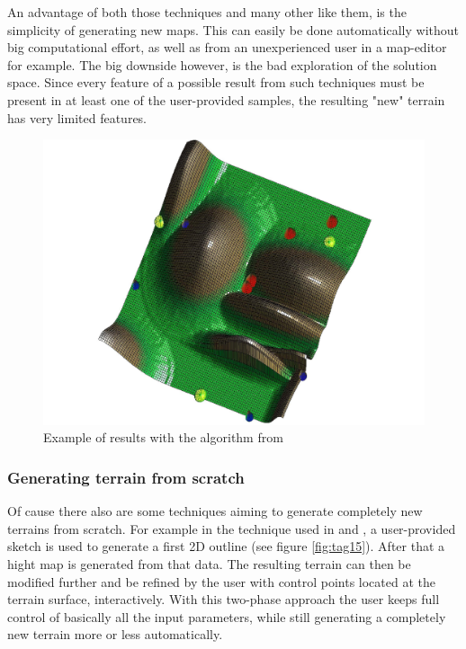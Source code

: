 An advantage of both those techniques and many other like them, is the simplicity of generating new maps. This can easily be done automatically without big computational effort, as well as from an unexperienced user in a map-editor for example. The big downside however, is the bad exploration of the solution space. Since every feature of a possible result from such techniques must be present in at least one of the user-provided samples, the resulting "new" terrain has very limited features.

\begin{figure}[htb]
	\centering
	\includegraphics[width=\linewidth]{RZL12/rthrhrh.jpg}
	\caption{Example of results with the algorithm from \cite{togelius2010towards}}
	\label{fig:tag23}
\end{figure}

\subsubsection{Generating terrain from scratch}
Of cause there also are some techniques aiming to generate completely new terrains from scratch. For example in the technique used in \cite{ong2005terrain} and \cite{saunders2006realistic}, a user-provided sketch is used to generate a first 2D outline (see figure \ref{fig:tag15}). After that a hight map is generated from that data. The resulting terrain can then be modified further and be refined by the user with control points located at the terrain surface, interactively. With this two-phase approach the user keeps full control of basically all the input parameters, while still generating a completely new terrain more or less automatically.

